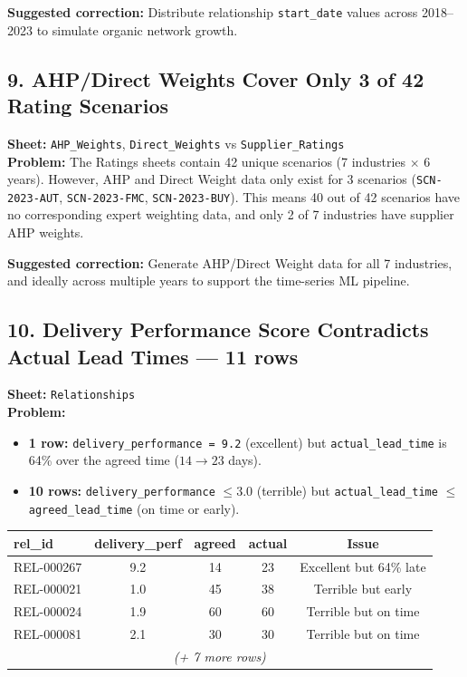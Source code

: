 \documentclass[11pt]{article}
\begin{document}
\medskip
\noindent\textbf{Suggested correction:} Distribute relationship \texttt{start\_date} values across 2018--2023 to simulate organic network growth.

\bigskip

\subsection*{9. AHP/Direct Weights Cover Only 3 of 42 Rating Scenarios}
\textbf{Sheet:} \texttt{AHP\_Weights}, \texttt{Direct\_Weights} vs \texttt{Supplier\_Ratings}\\
\textbf{Problem:} The Ratings sheets contain 42 unique scenarios (7 industries $\times$ 6 years). However, AHP and Direct Weight data only exist for 3 scenarios (\texttt{SCN-2023-AUT}, \texttt{SCN-2023-FMC}, \texttt{SCN-2023-BUY}). This means 40 out of 42 scenarios have no corresponding expert weighting data, and only 2 of 7 industries have supplier AHP weights.

\medskip
\noindent\textbf{Suggested correction:} Generate AHP/Direct Weight data for all 7 industries, and ideally across multiple years to support the time-series ML pipeline.

\bigskip

\subsection*{10. Delivery Performance Score Contradicts Actual Lead Times --- 11 rows}
\textbf{Sheet:} \texttt{Relationships}\\
\textbf{Problem:}
\begin{itemize}[nosep]
    \item \textbf{1 row:} \texttt{delivery\_performance = 9.2} (excellent) but \texttt{actual\_lead\_time} is 64\% over the agreed time ($14 \rightarrow 23$ days).
    \item \textbf{10 rows:} \texttt{delivery\_performance} $\leq 3.0$ (terrible) but \texttt{actual\_lead\_time} $\leq$ \texttt{agreed\_lead\_time} (on time or early).
\end{itemize}

\begin{center}
\begin{tabular}{lcccc}
\toprule
\textbf{rel\_id} & \textbf{delivery\_perf} & \textbf{agreed} & \textbf{actual} & \textbf{Issue} \\
\midrule
REL-000267 & \textcolor{critred}{9.2} & 14 & 23 & Excellent but 64\% late \\
REL-000021 & \textcolor{critred}{1.0} & 45 & 38 & Terrible but early \\
REL-000024 & \textcolor{critred}{1.9} & 60 & 60 & Terrible but on time \\
REL-000081 & \textcolor{critred}{2.1} & 30 & 30 & Terrible but on time \\
\multicolumn{5}{c}{\emph{(+ 7 more rows)}} \\
\bottomrule
\end{tabular}
\end{center}
\end{document}
